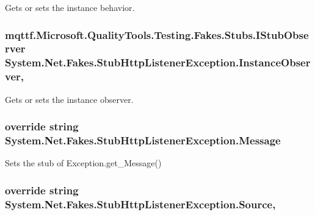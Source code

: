 Gets or sets the instance behavior.

\hypertarget{class_system_1_1_net_1_1_fakes_1_1_stub_http_listener_exception_ad595690570d80b3ce9c3ba801ee7342c}{
\subsubsection[{Instance\-Observer}]{\setlength{\rightskip}{0pt plus 5cm}mqttf.\-Microsoft.\-Quality\-Tools.\-Testing.\-Fakes.\-Stubs.\-I\-Stub\-Observer System.\-Net.\-Fakes.\-Stub\-Http\-Listener\-Exception.\-Instance\-Observer\hspace{0.3cm}{\ttfamily [get]}, {\ttfamily [set]}}}\label{class_system_1_1_net_1_1_fakes_1_1_stub_http_listener_exception_ad595690570d80b3ce9c3ba801ee7342c}


Gets or sets the instance observer.

\hypertarget{class_system_1_1_net_1_1_fakes_1_1_stub_http_listener_exception_a960e66969c5be5e791c753143bd52061}{
\subsubsection[{Message}]{\setlength{\rightskip}{0pt plus 5cm}override string System.\-Net.\-Fakes.\-Stub\-Http\-Listener\-Exception.\-Message\hspace{0.3cm}{\ttfamily [get]}}}\label{class_system_1_1_net_1_1_fakes_1_1_stub_http_listener_exception_a960e66969c5be5e791c753143bd52061}


Sets the stub of Exception.\-get\-\_\-\-Message()

\hypertarget{class_system_1_1_net_1_1_fakes_1_1_stub_http_listener_exception_ac5ecdd8e5f07e93ffd35b78af03da6d9}{
\subsubsection[{Source}]{\setlength{\rightskip}{0pt plus 5cm}override string System.\-Net.\-Fakes.\-Stub\-Http\-Listener\-Exception.\-Source\hspace{0.3cm}{\ttfamily [get]}, {\ttfamily [set]}}}\label{class_system_1_1_net_1_1_fakes_1_1_stub_http_listener_exception_ac5ecdd8e5f07e93ffd35b78af03da6d9}



